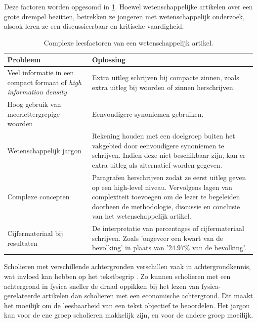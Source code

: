\medspace

Deze factoren worden opgesomd in \ref{table:scientific-paper-struggles}. Hoewel wetenschappelijke artikelen over een grote drempel bezitten, betrekken ze jongeren met wetenschappelijk onderzoek, alsook leren ze een discussieerbaar en kritische vaardigheid. 

\medspace

\begin{center}
	\begin{table}[H]
	\begin{tabular}{| m{4cm} | m{10cm} |}
		\hline
		\textbf{Probleem} & \textbf{Oplossing} \\
		\hline
		Veel informatie in een compact formaat of \textit{high information density} & Extra uitleg schrijven bij compacte zinnen, zoals extra uitleg bij woorden of zinnen herschrijven. \\
		\hline
		Hoog gebruik van meerlettergrepige woorden & Eenvoudigere synoniemen gebruiken. \\
		\hline
		Wetenschappelijk jargon & Rekening houden met een doelgroep buiten het vakgebied door eenvoudigere synoniemen te schrijven. Indien deze niet beschikbaar zijn, kan er extra uitleg als alternatief worden gegeven. \\
		\hline
		Complexe concepten & Paragrafen herschrijven zodat ze eerst uitleg geven op een high-level niveau. Vervolgens lagen van complexiteit toevoegen om de lezer te begeleiden doorheen de methodologie, discussie en conclusie van het wetenschappelijk artikel. \\ 
		\hline
		Cijfermateriaal bij resultaten & De interpretatie van percentages of cijfermateriaal schrijven. Zoals 'ongeveer een kwart van de bevolking' in plaats van '24.97\% van de bevolking'. \\
		\hline
	\end{tabular}
	\caption{Complexe leesfactoren van een wetenschappelijk artikel.}
	\label{table:scientific-paper-struggles}
	\end{table}
\end{center}

Scholieren met verschillende achtergronden verschillen vaak in achtergrondkennis, wat invloed kan hebben op het tekstbegrip \autocite{DeMeyer2019}. Zo kunnen scholieren met een achtergrond in fysica sneller de draad oppikken bij het lezen van fysica-gerelateerde artikelen dan scholieren met een economische achtergrond. Dit maakt het moeilijk om de leesbaarheid van een tekst objectief te beoordelen. Het jargon kan voor de ene groep scholieren makkelijk zijn, en voor de andere groep moeilijk.

